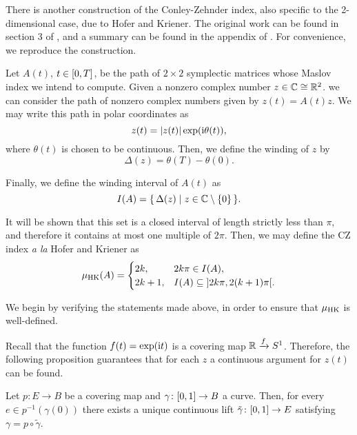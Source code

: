 There is another construction of the Conley-Zehnder index, also specific to the 2-dimensional case, due to Hofer and Kriener. The original work can be found in section 3 of \cite{hoferkriener}, and a summary can be found in the appendix of \cite{hwz}. For convenience, we reproduce the construction.

Let $A(t)$, $t \in \interval 0 T$, be the path of $2 \times 2$ symplectic matrices whose Maslov index we intend to compute. Given a nonzero complex number $z \in \mathbb{C} \cong \mathbb{R}^2$. we can consider the path of nonzero complex numbers given by $z(t) = A(t) z$. We may write this path in polar coordinates as
\begin{equation}
z(t) = \lvert z(t)\rvert \exp(\mathrm{i} \theta(t)),
\end{equation}
where $\theta(t)$ is chosen to be continuous. Then, we define the winding of $z$ by
\begin{equation}
\Delta(z) = \theta(T) - \theta(0).
\end{equation}

Finally, we define the winding interval of $A(t)$ as
\begin{equation}
I(A) = \{\, \Delta(z) \mid z \in \mathbb{C} \setminus \{0\} \,\}.
\end{equation}

It will be shown that this set is a closed interval of length strictly less than $\pi$, and therefore it contains at most one multiple of $2\pi$. Then, we may define the CZ index \textit{a la} Hofer and Kriener as
\begin{equation}\label{def:muhk}
\muhk(A) = \begin{cases}
2 k, & 2 k \pi \in I(A),\\
2k+1, & I(A) \subseteq \ointerval {2k\pi}{2(k+1)\pi}.
\end{cases} 
\end{equation}

We begin by verifying the statements made above, in order to ensure that $\mu_{\mathrm{HK}}$ is well-defined.

Recall that the function $f(t) = \exp(\mathrm{i} t)$ is a covering map $\mathbb{R} \xrightarrow{f} S^1$. Therefore, the following proposition guarantees that for each $z$ a continuous argument for $z(t)$ can be found.

\begin{prop}\label{prop:pathliftingproperty}
Let $p \colon E \to B$ be a covering map and $\gamma \colon \interval01 \to B$ a curve. Then, for every $e \in p^{-1}(\gamma(0))$ there exists a unique continuous lift $\tilde \gamma \colon \interval01 \to E$ satisfying $\gamma = p \circ \tilde \gamma$.
\end{prop}

